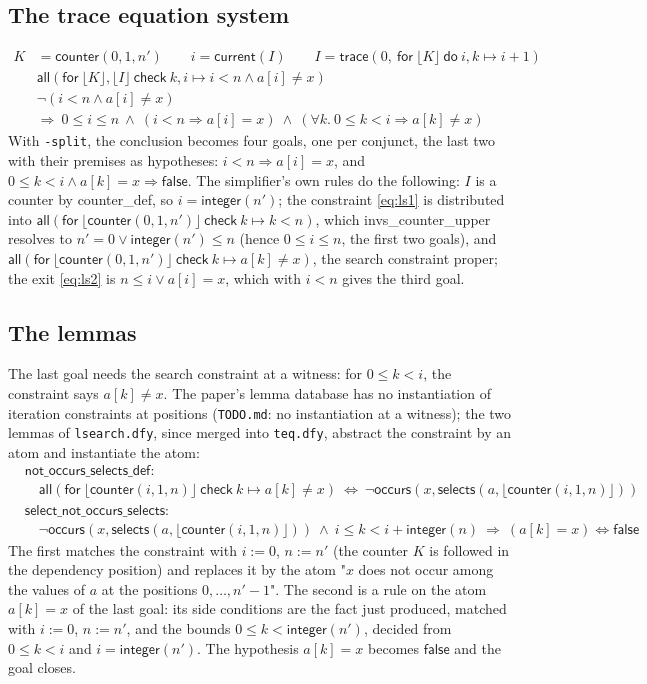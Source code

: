 \documentclass[11pt,a4paper]{article}
\newcommand{\bl}[1]{\lfloor #1\rfloor}                       %
\newcommand{\tr}[3]{\mathsf{trace}(#1,\ \mathsf{for}\ #2\ \mathsf{do}\ #3)}
\newcommand{\al}[2]{\mathsf{all}(\mathsf{for}\ #1\ \mathsf{check}\ #2)}
\newcommand{\cnt}{\mathsf{counter}}
\newcommand{\cur}{\mathsf{current}}
\newcommand{\intf}{\mathsf{integer}}
\newcommand{\lemma}[1]{\textsf{#1}}
\begin{document}
\subsection{The trace equation system}
\begin{align}
  K &= \cnt(0, 1, n') \qquad i = \cur(I) \qquad I = \tr{0}{\bl{K}}{i, k \mapsto i + 1} \label{eq:ls0}\\
  &\al{\bl{K}, \bl{I}}{k, i \mapsto i < n \wedge a[i] \ne x} \label{eq:ls1}\\
  &\neg(i < n \wedge a[i] \ne x) \label{eq:ls2}\\
  &\Longrightarrow\ 0 \le i \le n\ \wedge\ (i < n \Rightarrow a[i] = x)\ \wedge\ (\forall k.\ 0 \le k < i \Rightarrow a[k] \ne x) \nonumber
\end{align}
With \texttt{-split}, the conclusion becomes four goals, one per conjunct, the last two with their premises
as hypotheses: $i < n \Rightarrow a[i] = x$, and $0 \le k < i \wedge a[k] = x \Rightarrow \mathsf{false}$.
The simplifier's own rules do the following: $I$ is a counter by \lemma{counter\_def}, so
$i = \intf(n')$; the constraint \eqref{eq:ls1} is distributed into
$\al{\bl{\cnt(0, 1, n')}}{k \mapsto k < n}$, which \lemma{invs\_counter\_upper} resolves to
$n' = 0 \vee \intf(n') \le n$ (hence $0 \le i \le n$, the first two goals), and
$\al{\bl{\cnt(0, 1, n')}}{k \mapsto a[k] \ne x}$, the search constraint proper; the exit
\eqref{eq:ls2} is $n \le i \vee a[i] = x$, which with $i < n$ gives the third goal.

\subsection{The lemmas}
The last goal needs the search constraint at a witness: for $0 \le k < i$, the constraint says
$a[k] \ne x$. The paper's lemma database has no instantiation of iteration constraints at positions
(\texttt{TODO.md}: no instantiation at a witness); the two lemmas of \texttt{lsearch.dfy}, since merged
into \texttt{teq.dfy}, abstract the constraint by an atom and instantiate the atom:
\begin{align*}
  &\lemma{not\_occurs\_selects\_def}:\\
  &\quad \al{\bl{\cnt(i, 1, n)}}{k \mapsto a[k] \ne x}\ \Longleftrightarrow\ \neg\mathsf{occurs}(x, \mathsf{selects}(a, \bl{\cnt(i, 1, n)}))\\[4pt]
  &\lemma{select\_not\_occurs\_selects}:\\
  &\quad \neg\mathsf{occurs}(x, \mathsf{selects}(a, \bl{\cnt(i, 1, n)}))\ \wedge\ i \le k < i + \intf(n)
    \ \Longrightarrow\ (a[k] = x) \Longleftrightarrow \mathsf{false}
\end{align*}
The first matches the constraint with $i := 0$, $n := n'$ (the counter $K$ is followed in the dependency
position) and replaces it by the atom "$x$ does not occur among the values of $a$ at the positions
$0, \ldots, n' - 1$". The second is a rule on the atom $a[k] = x$ of the last goal: its side conditions
are the fact just produced, matched with $i := 0$, $n := n'$, and the bounds $0 \le k < \intf(n')$,
decided from $0 \le k < i$ and $i = \intf(n')$. The hypothesis $a[k] = x$ becomes $\mathsf{false}$ and
the goal closes.
\end{document}

